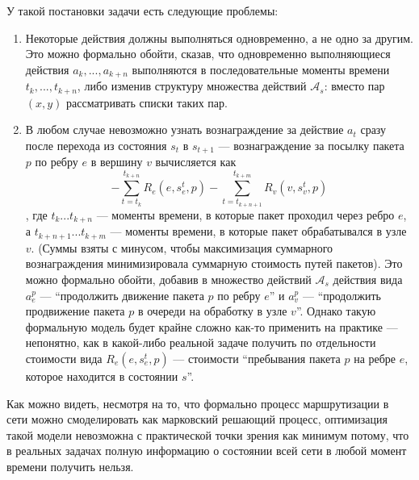 \documentclass[specification,annotation,times]{itmo-student-thesis}
\theoremstyle{definition}
\begin{document}
У такой постановки задачи есть следующие проблемы:
\begin{enumerate}
\item Некоторые действия должны выполняться одновременно, а не одно за другим.
  Это можно формально обойти, сказав, что одновременно выполняющиеся действия
  $a_k, ... , a_{k+n}$ выполняются в последовательные моменты времени
  $t_k, ... , t_{k+n}$, либо изменив структуру множества действий
  $\mathcal{A}_s$: вместо пар $(x, y)$ рассматривать списки таких пар.
\item В любом случае невозможно узнать вознаграждение за действие $a_t$ сразу
  после перехода из состояния $s_t$ в $s_{t+1}$ --- вознаграждение за посылку
  пакета $p$ по ребру $e$ в вершину $v$ вычисляется как
  \[
  - \sum\limits_{t=t_k}^{t_{k+n}} {R_e(e, s_e^t, p)} -
  \sum\limits_{t=t_{k+n+1}}^{t_{k+m}} R_v(v, s_v^t, p)
  \]
  , где $t_k ... t_{k+n}$ --- моменты времени, в которые пакет проходил через
  ребро $e$, а $t_{k+n+1} ... t_{k+m}$ --- моменты времени, в которые пакет
  обрабатывался в узле $v$. (Суммы взяты с минусом, чтобы максимизация
  суммарного вознаграждения минимизировала суммарную стоимость путей пакетов).
  Это можно формально обойти, добавив в множество действий $\mathcal{A}_s$
  действия вида $a_e^p$ --- \enquote{продолжить движение пакета
  $p$ по ребру $e$} и $a_v^p$ --- \enquote{продолжить продвижение пакета $p$ в очереди на
  обработку в узле $v$}. Однако такую формальную модель будет крайне сложно
  как-то применить на практике --- непонятно, как в какой-либо реальной задаче
  получить по отдельности стоимости вида $R_e(e, s_e^t, p)$ --- стоимости
  \enquote{пребывания пакета $p$ на ребре $e$, которое находится в состоянии $s$}.
\end{enumerate}

Как можно видеть, несмотря на то, что формально процесс маршрутизации в сети
можно смоделировать как марковский решающий процесс, оптимизация такой модели
невозможна с практической точки зрения как минимум потому, что в реальных
задачах полную информацию о состоянии всей сети в любой момент времени получить
нельзя.
\end{document}
